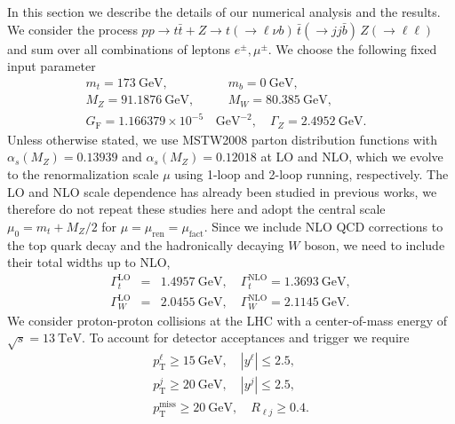 \documentclass[preprint]{JHEP3} %
\newcommand{\GeV}{\mathrm{GeV}}
\newcommand{\TeV}{\mathrm{TeV}}
\newcommand{\pT}{p_{\mathrm{T}}}
\def\ttb{t\bar{t}}
\newcommand{\be}{\begin{eqnarray}}
\newcommand{\ee}{\end{eqnarray}}
\begin{document}
In this section we describe the details of our numerical analysis and the results.
We consider the process 
$pp \to \ttb + Z \to t(\to \ell \nu b) \, \bar{t} (\to jj \bar{b}) \, Z(\to \ell \ell)$
and sum over all combinations of leptons $e^\pm, \mu^\pm$.
We choose the following fixed input parameter
\be
 m_t = 173~\GeV,& \quad   m_b = 0~\GeV,&
\nonumber\\
 M_Z =91.1876~\GeV,& \quad  M_W =80.385~\GeV,&
\nonumber\\
 G_\mathrm{F} = 1.166379 \times 10^{-5} \,& \GeV^{-2},  \quad \Gamma_Z = 2.4952~\GeV.&
\ee
Unless otherwise stated, we use MSTW2008 parton distribution functions \cite{...} with 
$\alpha_s(M_Z)=0.13939$ and $\alpha_s(M_Z)=0.12018$ at LO and NLO, which we
evolve to the renormalization scale $\mu$ using 1-loop and 2-loop running, respectively.
The LO and NLO scale dependence has already been studied in previous works,
we therefore do not repeat these studies here and adopt the central scale \cite{Lazopoulos:2008de}  
$\mu_0=m_t + M_Z/2$ 
for $\mu=\mu_\mathrm{ren}=\mu_\mathrm{fact}$.
Since we include NLO QCD corrections to the top quark decay and the hadronically decaying $W$ boson, we need to 
include their total widths up to NLO,
\be
 \Gamma_t^\mathrm{LO} &=& 1.4957~\GeV, \quad \Gamma_t^\mathrm{NLO} = 1.3693~\GeV,
\nonumber\\
 \Gamma_W^\mathrm{LO} &=& 2.0455~\GeV, \quad \Gamma_W^\mathrm{NLO} = 2.1145~\GeV.
\ee
We consider proton-proton collisions at the LHC with a center-of-mass energy of $\sqrt{s}=13~\TeV$.
To account for detector acceptances and trigger we require
\be
 \pT^{\ell} \ge 15~\GeV, \quad |y^{\ell}| \le 2.5,
\nonumber\\
 \pT^{j} \ge 20~\GeV, \quad |y^{j}| \le 2.5,
\nonumber\\
 \pT^{\mathrm{miss}} \ge 20~\GeV, \quad R_{\ell j} \ge 0.4.
\ee
\end{document}
